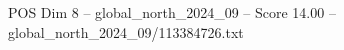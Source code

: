 \begin{textsample}{POS Dim 8 – global\_north\_2024\_09 – Score 14.00 – global\_north\_2024\_09/113384726.txt}
\end{textsample}
